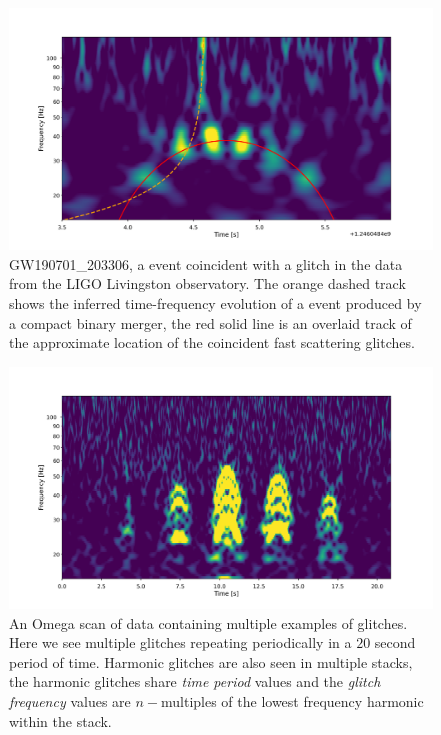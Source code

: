 \begin{figure}
  \includegraphics[width=\textwidth]{images/archenemy/Section1/GW190701_203306_overlay.pdf}
  \caption{GW190701\_203306, a \gw{} event coincident with a \scl{} glitch in the data from the LIGO Livingston observatory. The orange dashed track shows the inferred time-frequency evolution of a \gw{} event produced by a compact binary merger, the red solid line is an overlaid track of the approximate location of the coincident fast scattering glitches.}
  \label{fig:obscured_detection}
\end{figure}

\begin{figure}
  \includegraphics[width=\textwidth]{images/archenemy/Section1/multiple_harmonics.pdf}
  \caption{An Omega scan \cite{omegascan} of \gw{} data containing multiple examples of \scl{} glitches. Here we see multiple \scl{} glitches repeating periodically in a $20$ second period of time. Harmonic \scl{} glitches are also seen in multiple stacks, the harmonic glitches share \emph{time period} values and the \emph{glitch frequency} values are $n-$multiples of the lowest frequency harmonic within the stack.}
  \label{fig:consec_scattered_light}
\end{figure}


